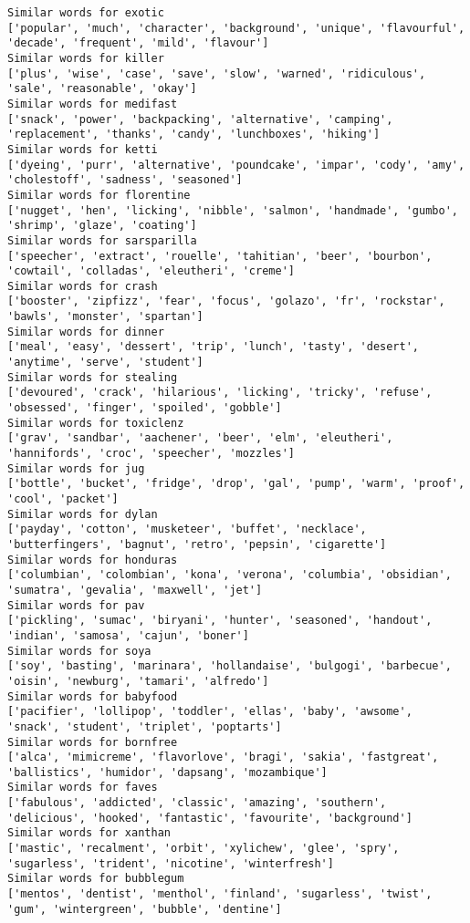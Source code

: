 \documentclass[11pt]{article}
\begin{document}
\begin{Verbatim}[commandchars=\\\{\}]
Similar words for exotic
['popular', 'much', 'character', 'background', 'unique', 'flavourful', 'decade', 'frequent', 'mild', 'flavour']
Similar words for killer
['plus', 'wise', 'case', 'save', 'slow', 'warned', 'ridiculous', 'sale', 'reasonable', 'okay']
Similar words for medifast
['snack', 'power', 'backpacking', 'alternative', 'camping', 'replacement', 'thanks', 'candy', 'lunchboxes', 'hiking']
Similar words for ketti
['dyeing', 'purr', 'alternative', 'poundcake', 'impar', 'cody', 'amy', 'cholestoff', 'sadness', 'seasoned']
Similar words for florentine
['nugget', 'hen', 'licking', 'nibble', 'salmon', 'handmade', 'gumbo', 'shrimp', 'glaze', 'coating']
Similar words for sarsparilla
['speecher', 'extract', 'rouelle', 'tahitian', 'beer', 'bourbon', 'cowtail', 'colladas', 'eleutheri', 'creme']
Similar words for crash
['booster', 'zipfizz', 'fear', 'focus', 'golazo', 'fr', 'rockstar', 'bawls', 'monster', 'spartan']
Similar words for dinner
['meal', 'easy', 'dessert', 'trip', 'lunch', 'tasty', 'desert', 'anytime', 'serve', 'student']
Similar words for stealing
['devoured', 'crack', 'hilarious', 'licking', 'tricky', 'refuse', 'obsessed', 'finger', 'spoiled', 'gobble']
Similar words for toxiclenz
['grav', 'sandbar', 'aachener', 'beer', 'elm', 'eleutheri', 'hannifords', 'croc', 'speecher', 'mozzles']
Similar words for jug
['bottle', 'bucket', 'fridge', 'drop', 'gal', 'pump', 'warm', 'proof', 'cool', 'packet']
Similar words for dylan
['payday', 'cotton', 'musketeer', 'buffet', 'necklace', 'butterfingers', 'bagnut', 'retro', 'pepsin', 'cigarette']
Similar words for honduras
['columbian', 'colombian', 'kona', 'verona', 'columbia', 'obsidian', 'sumatra', 'gevalia', 'maxwell', 'jet']
Similar words for pav
['pickling', 'sumac', 'biryani', 'hunter', 'seasoned', 'handout', 'indian', 'samosa', 'cajun', 'boner']
Similar words for soya
['soy', 'basting', 'marinara', 'hollandaise', 'bulgogi', 'barbecue', 'oisin', 'newburg', 'tamari', 'alfredo']
Similar words for babyfood
['pacifier', 'lollipop', 'toddler', 'ellas', 'baby', 'awsome', 'snack', 'student', 'triplet', 'poptarts']
Similar words for bornfree
['alca', 'mimicreme', 'flavorlove', 'bragi', 'sakia', 'fastgreat', 'ballistics', 'humidor', 'dapsang', 'mozambique']
Similar words for faves
['fabulous', 'addicted', 'classic', 'amazing', 'southern', 'delicious', 'hooked', 'fantastic', 'favourite', 'background']
Similar words for xanthan
['mastic', 'recalment', 'orbit', 'xylichew', 'glee', 'spry', 'sugarless', 'trident', 'nicotine', 'winterfresh']
Similar words for bubblegum
['mentos', 'dentist', 'menthol', 'finland', 'sugarless', 'twist', 'gum', 'wintergreen', 'bubble', 'dentine']

\end{Verbatim}
\end{document}
